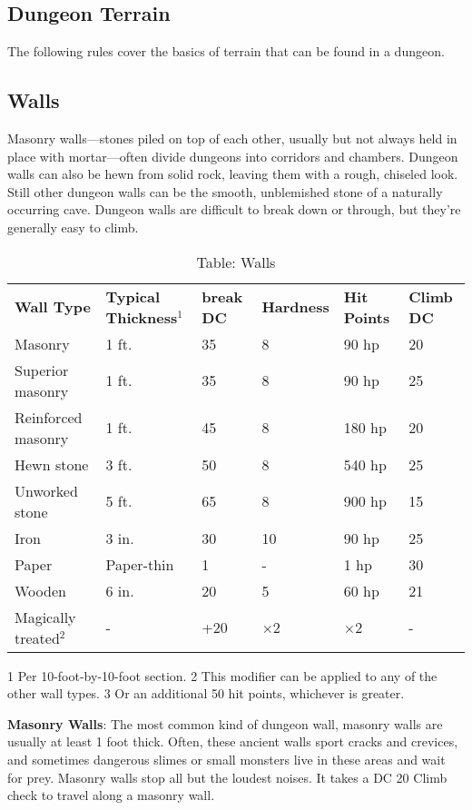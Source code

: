 \subsection{Dungeon Terrain}

				
The following rules cover the basics of terrain that can be found in a dungeon.
				
\subsection{Walls}

				
Masonry walls---stones piled on top of each other, usually but not always held in place with mortar---often divide dungeons into corridors and chambers. Dungeon walls can also be hewn from solid rock, leaving them with a rough, chiseled look. Still other dungeon walls can be the smooth, unblemished stone of a naturally occurring cave. Dungeon walls are difficult to break down or through, but they're generally easy to climb.

\begin{table}[]
\sffamily
\caption{Table: Walls}
\begin{tabular}{llllll}
\textbf{Wall Type} & \textbf{Typical Thickness\(^{1}\)} & \textbf{break DC} & \textbf{Hardness} & \textbf{Hit Points} & \textbf{Climb DC}\\
Masonry & 1 ft. & 35 & 8 & 90 hp & 20\\
Superior masonry & 1 ft. & 35 & 8 & 90 hp & 25\\
Reinforced masonry & 1 ft. & 45 & 8 & 180 hp & 20\\
Hewn stone & 3 ft. & 50 & 8 & 540 hp & 25\\
Unworked stone & 5 ft. & 65 & 8 & 900 hp & 15\\
Iron & 3 in. & 30 & 10 & 90 hp & 25\\
Paper & Paper-thin & 1 & - & 1 hp & 30\\
Wooden & 6 in. & 20 & 5 & 60 hp & 21\\
Magically treated\(^{2}\) & - & +20 & \mbox{$\times$}2 & \mbox{$\times$}2 & -\\
\end{tabular}
1 Per 10-foot-by-10-foot section.
2 This modifier can be applied to any of the other wall types.
3 Or an additional 50 hit points, whichever is greater.
\end{table}

				
\textbf{Masonry Walls}: The most common kind of dungeon wall, masonry walls are usually at least 1 foot thick. Often, these ancient walls sport cracks and crevices, and sometimes dangerous slimes or small monsters live in these areas and wait for prey. Masonry walls stop all but the loudest noises. It takes a DC 20 Climb check to travel along a masonry wall.
				
